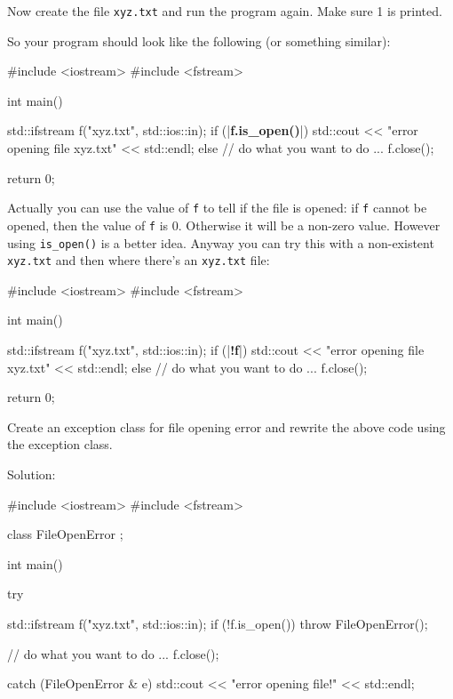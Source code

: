 \begin{consolethree}[escapeinside=||]
\begin{ex} Now create the file \texttt{xyz.txt} and run the
program again. Make sure 1 is printed.

So your program should look like the following (or something similar):

\begin{consolethree}[escapeinside=||]
#include <iostream>
#include <fstream>

int main()
{   
    std::ifstream f("xyz.txt", std::ios::in);
    if (|\textbf{f.is\_open()}|)
    {    
         std::cout << "error opening file xyz.txt"
                   << std::endl;
    }
    else
    {   
         // do what you want to do ...
         f.close();
    }
    
    return 0;
}
\end{consolethree}
\end{ex}
Actually you can use the value of \texttt{f} to tell if the file is opened: if \texttt{f} cannot be opened, then the value of \texttt{f} is 0. Otherwise it will be a non-zero value. However using \texttt{is\_open()} is a better idea. Anyway you can try this with a non-existent \texttt{xyz.txt} and then where there's an \texttt{xyz.txt} file:

\begin{consolethree}[escapeinside=||]
#include <iostream>
#include <fstream>

int main()
{   
    std::ifstream f("xyz.txt", std::ios::in);
    if (|\textbf{!f}|)
    {   
         std::cout << "error opening file xyz.txt"
                   << std::endl;
    }
    else
    {    
         // do what you want to do ...
         f.close();
    }

    return 0;

}
\end{consolethree}

\begin{ex} Create an exception class for file opening error and
rewrite the above code using the exception class.
\end{ex}
Solution:

\begin{console}
#include <iostream>
#include <fstream>

class FileOpenError
{};

int main()
{   
    try
    {   
         std::ifstream f("xyz.txt", std::ios::in);
         if (!f.is_open())
            throw FileOpenError();

         // do what you want to do ...
         f.close();
     }
     catch (FileOpenError & e)
     {   
         std::cout << "error opening file!"
                   << std::endl;
     }

}
\end{console}
\end{consolethree}
